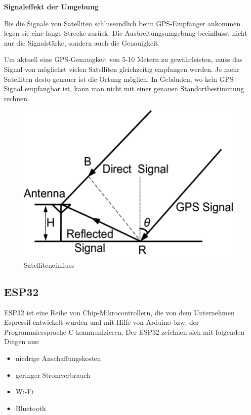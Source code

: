 \newpage
\textbf{Signaleffekt der Umgebung}


Bis die Signale von Satelliten schlussendlich beim GPS-Empfänger ankommen legen sie eine lange Strecke zurück. Die Ausbreitungsumgebung beeinflusst nicht nur die Signalstärke, sondern auch die Genauigkeit.

Um aktuell eine GPS-Genauigkeit von 5-10 Metern zu gewährleisten, muss das Signal von möglichst vielen Satelliten gleichzeitig empfangen werden. Je mehr Satelliten desto genauer ist die Ortung möglich. In Gebäuden, wo kein GPS-Signal empfangbar ist, kann man nicht mit einer genauen Standortbestimmung rechnen. \parencite{GPSGenauigkeit}

\begin{figure}[H]
	\centering
	\includegraphics[width=0.7\linewidth]{images/Satelliteneinfluss.jpg}
	\caption[Satelliteneinfluss]{Satelliteneinfluss}
	\label{fig:Satelliteneinfluss}
\end{figure}

\newpage
\subsection{ESP32} \label{ESP32}

ESP32 ist eine Reihe von Chip-Mikrocontrollern, die von dem Unternehmen Espressif entwickelt wurden und mit Hilfe von Arduino bzw. der Programmiersprache C kommunizieren. Der ESP32 \textcite{ESP32} zeichnen sich mit folgenden Dingen aus:

\begin{itemize}
	\item niedrige Anschaffungskosten
	\item geringer Stromverbrauch
	\item Wi-Fi
	\item Bluetooth
\end{itemize}


